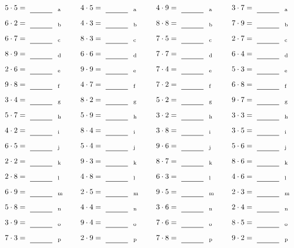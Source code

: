 \documentclass
[
  draft    = true,
  fontsize = 11pt,
  parskip  = half-
]
{scrartcl}
\begin{document}
\par\vfill\par
\begin{align*}
    \pline{5\cdot5}&=\rline{a}
  & \pline{4\cdot5}&=\rline{a}
  & \pline{4\cdot9}&=\rline{a}
  & \pline{3\cdot7}&=\rline{a} \\[1ex]
    \pline{6\cdot2}&=\rline{b}
  & \pline{4\cdot3}&=\rline{b}
  & \pline{8\cdot8}&=\rline{b}
  & \pline{7\cdot9}&=\rline{b} \\[1ex]
    \pline{6\cdot7}&=\rline{c}
  & \pline{8\cdot3}&=\rline{c}
  & \pline{7\cdot5}&=\rline{c}
  & \pline{2\cdot7}&=\rline{c} \\[1ex]
    \pline{8\cdot9}&=\rline{d}
  & \pline{6\cdot6}&=\rline{d}
  & \pline{7\cdot7}&=\rline{d}
  & \pline{6\cdot4}&=\rline{d} \\[1ex]
    \pline{2\cdot6}&=\rline{e}
  & \pline{9\cdot9}&=\rline{e}
  & \pline{7\cdot4}&=\rline{e}
  & \pline{5\cdot3}&=\rline{e} \\[1ex]
    \pline{9\cdot8}&=\rline{f}
  & \pline{4\cdot7}&=\rline{f}
  & \pline{7\cdot2}&=\rline{f}
  & \pline{6\cdot8}&=\rline{f} \\[1ex]
    \pline{3\cdot4}&=\rline{g}
  & \pline{8\cdot2}&=\rline{g}
  & \pline{5\cdot2}&=\rline{g}
  & \pline{9\cdot7}&=\rline{g} \\[1ex]
    \pline{5\cdot7}&=\rline{h}
  & \pline{5\cdot9}&=\rline{h}
  & \pline{3\cdot2}&=\rline{h}
  & \pline{3\cdot3}&=\rline{h} \\[1ex]
    \pline{4\cdot2}&=\rline{i}
  & \pline{8\cdot4}&=\rline{i}
  & \pline{3\cdot8}&=\rline{i}
  & \pline{3\cdot5}&=\rline{i} \\[1ex]
    \pline{6\cdot5}&=\rline{j}
  & \pline{5\cdot4}&=\rline{j}
  & \pline{9\cdot6}&=\rline{j}
  & \pline{5\cdot6}&=\rline{j} \\[1ex]
    \pline{2\cdot2}&=\rline{k}
  & \pline{9\cdot3}&=\rline{k}
  & \pline{8\cdot7}&=\rline{k}
  & \pline{8\cdot6}&=\rline{k} \\[1ex]
    \pline{2\cdot8}&=\rline{l}
  & \pline{4\cdot8}&=\rline{l}
  & \pline{6\cdot3}&=\rline{l}
  & \pline{4\cdot6}&=\rline{l} \\[1ex]
    \pline{6\cdot9}&=\rline{m}
  & \pline{2\cdot5}&=\rline{m}
  & \pline{9\cdot5}&=\rline{m}
  & \pline{2\cdot3}&=\rline{m} \\[1ex]
    \pline{5\cdot8}&=\rline{n}
  & \pline{4\cdot4}&=\rline{n}
  & \pline{3\cdot6}&=\rline{n}
  & \pline{2\cdot4}&=\rline{n} \\[1ex]
    \pline{3\cdot9}&=\rline{o}
  & \pline{9\cdot4}&=\rline{o}
  & \pline{7\cdot6}&=\rline{o}
  & \pline{8\cdot5}&=\rline{o} \\[1ex]
    \pline{7\cdot3}&=\rline{p}
  & \pline{2\cdot9}&=\rline{p}
  & \pline{7\cdot8}&=\rline{p}
  & \pline{9\cdot2}&=\rline{p}
\end{align*}
\end{document}

